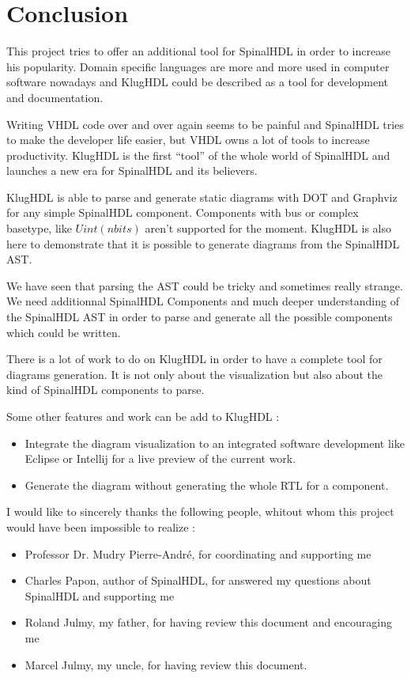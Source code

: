 \chapter{Conclusion}
\label{cha:Conclusion}

This project tries to offer an additional tool for SpinalHDL in order to
increase his popularity. Domain specific languages are more and more used in
computer software nowadays and KlugHDL could be described as a tool for
development and documentation.

Writing VHDL code over and over again seems to be painful and SpinalHDL tries to
make the developer life easier, but VHDL owns a lot of tools to increase
productivity. KlugHDL is the first ``tool'' of the whole world of SpinalHDL and
launches a new era for SpinalHDL and its believers.

KlugHDL is able to parse and generate static diagrams with DOT and Graphviz for
any simple SpinalHDL component. Components with bus or complex basetype, like
$Uint(n bits)$ aren't supported for the moment. KlugHDL is also here to
demonstrate that it is possible to generate diagrams from the SpinalHDL AST.

We have seen that parsing the AST could be tricky and sometimes really strange.
We need additionnal SpinalHDL Components and much deeper understanding of the
SpinalHDL AST in order to parse and generate all the possible components which
could be written.

There is a lot of work to do on KlugHDL in order to have a complete tool for
diagrams generation. It is not only about the visualization but also about the
kind of SpinalHDL components to parse.

Some other features and work can be add to KlugHDL :
\begin{itemize}
\item Integrate the diagram visualization to an integrated software development
  like Eclipse or Intellij for a live preview of the current work.
\item Generate the diagram without generating the whole RTL for a component.
\end{itemize}

I would like to sincerely thanks the following people, whitout whom this project
would have been impossible to realize :

\begin{itemize}
\item Professor Dr. Mudry Pierre-André, for coordinating and supporting me
\item Charles Papon, author of SpinalHDL, for answered my questions about
  SpinalHDL and supporting me
\item Roland Julmy, my father, for having review this document and encouraging
  me
  \item Marcel Julmy, my uncle, for having review this document.
\end{itemize}

